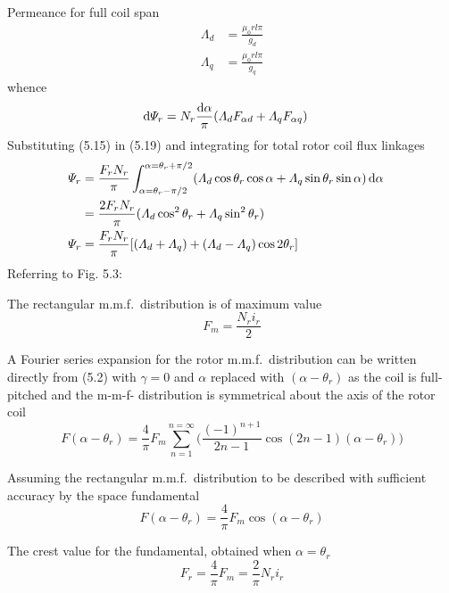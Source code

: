 \documentclass[a4paper,numbers=noenddot,12pt]{scrbook}
\begin{document}
Permeance for full coil span
\begin{equation}
    \begin{aligned}
        \varLambda_d & = \frac{\mu_0 r l \pi}{g_d}  \\
        \varLambda_q & = \frac{\mu_0 r l \pi}{g_q} 
    \end{aligned}
\end{equation}
whence
\begin{align}
    \dif \varPsi_r & = N_r \frac{\dif \alpha}{\pi} (\varLambda_d F_{\alpha d} + \varLambda_q F_{\alpha q})
\end{align} 
Substituting (5.15) in (5.19) and integrating for total rotor coil flux linkages
\begin{align}
    \varPsi_r & = \frac{F_r N_r}{\pi} \int_{\alpha = \theta_r  - \pi/2}^{\alpha = \theta_r  + \pi/2} (\varLambda_d \cos \theta_r \cos\alpha + \varLambda_q \sin \theta_r \sin \alpha) \dif \alpha && \\
    & = \frac{2 F_r N_r}{\pi} (\varLambda_d \cos^2 \theta_r + \varLambda_q \sin^2 \theta_r) && \nonumber \\
    \varPsi_r & = \frac{F_r N_r}{\pi} [(\varLambda_d + \varLambda_q) + (\varLambda_d - \varLambda_q)\cos 2 \theta_r ] &&
\end{align}
Referring to Fig. 5.3:

\noindent
The rectangular m.m.f.\ distribution is of maximum value
\begin{equation*}
    F_m=\frac{N_r i_r}{2}
\end{equation*}

A Fourier series expansion for the rotor m.m.f.\ distribution can be written directly from (5.2) with $\gamma=0$ and $\alpha$ replaced with $(\alpha - \theta_r)$ as the coil is full-pitched and the m-m-f- distribution is symmetrical about the axis of the rotor coil
\begin{equation*}
    F(\alpha - \theta_r) = \frac{4}{\pi} F_m \displaystyle \sum_{n = 1}^{n = \infty} \bigg( \frac{{(-1)}^{n+1}}{2n - 1} \cos(2n - 1)(\alpha - \theta_r) \bigg)
\end{equation*}

Assuming the rectangular m.m.f.\ distribution to be described with sufficient accuracy by the space fundamental
\begin{equation}
    F(\alpha - \theta_r) = \frac{4}{\pi} F_m \cos(\alpha - \theta_r)
\end{equation}

The crest value for the fundamental, obtained when $\alpha = \theta_r$
\begin{equation}
    F_r = \frac{4}{\pi}F_m = \frac{2}{\pi} N_r i_r
\end{equation}
\end{document}
